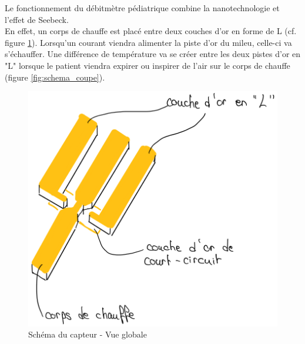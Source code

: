 Le fonctionnement du débitmètre pédiatrique combine la nanotechnologie et l'effet de Seebeck. \\
En effet, un corps de chauffe est placé entre deux couches d'or en forme de L (cf. figure \ref{fig:schema_global}). Lorsqu'un courant viendra 
alimenter la piste d'or du mileu, celle-ci va s'échauffer. Une différence de température va se créer entre les deux pistes d'or en "L" lorsque 
le patient viendra expirer ou inspirer de l'air sur le corps de chauffe (figure \ref{fig:schema_coupe}). 
\begin{figure}[H]
    \centering
    \includegraphics[scale = 0.4]{assets/figures/schema_capteur_vue_generale.png}
    \caption{Schéma du capteur - Vue globale}
    \label{fig:schema_global}
\end{figure}
